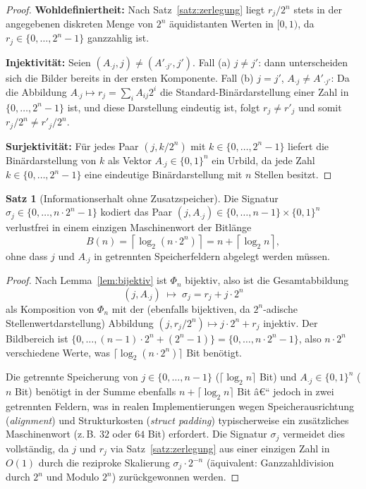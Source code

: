 ﻿\documentclass[a4paper,12pt]{article}
\theoremstyle{definition}
\newtheorem{satz}{Satz}
\begin{document}
\begin{proof}
	\textbf{Wohldefiniertheit:} Nach Satz~\ref{satz:zerlegung} liegt
	$r_j/2^n$ stets in der angegebenen diskreten Menge von $2^n$ äquidistanten
	Werten in $[0,1)$, da $r_j \in \{0,\ldots,2^n-1\}$ ganzzahlig ist.

	\textbf{Injektivität:} Seien $(A_{\cdot j}, j) \neq (A'_{\cdot j'}, j')$.
	Fall (a) $j \neq j'$: dann unterscheiden sich die Bilder bereits in der
	ersten Komponente. Fall (b) $j = j'$, $A_{\cdot j} \neq A'_{\cdot j'}$:
	Da die Abbildung $A_{\cdot j} \mapsto r_j = \sum_i A_{ij}2^i$ die
	Standard-Binärdarstellung einer Zahl in $\{0,\ldots,2^n-1\}$ ist, und
	diese Darstellung eindeutig ist, folgt $r_j \neq r'_j$ und somit
	$r_j/2^n \neq r'_j/2^n$.

	\textbf{Surjektivität:} Für jedes Paar $(j, k/2^n)$ mit
	$k\in\{0,\ldots,2^n-1\}$ liefert die Binärdarstellung von $k$ als Vektor
	$A_{\cdot j} \in \{0,1\}^n$ ein Urbild, da jede Zahl $k \in \{0,\ldots,2^n-1\}$
	eine eindeutige Binärdarstellung mit $n$ Stellen besitzt. \qedhere
\end{proof}

\begin{satz}[Informationserhalt ohne Zusatzspeicher]
\label{satz:infoerhalt}
	Die Signatur $\sigma_j \in \{0,\ldots,n\cdot 2^n - 1\}$ kodiert das Paar
	$(j, A_{\cdot j}) \in \{0,\ldots,n-1\}\times\{0,1\}^n$ verlustfrei in
	einem einzigen Maschinenwort der Bitlänge
	\[
		B(n) = \left\lceil \log_2(n\cdot 2^n) \right\rceil
		= n + \left\lceil \log_2 n \right\rceil,
	\]
	ohne dass $j$ und $A_{\cdot j}$ in getrennten Speicherfeldern abgelegt
	werden müssen.
\end{satz}

\begin{proof}
	Nach Lemma~\ref{lem:bijektiv} ist $\Phi_n$ bijektiv, also ist die
	Gesamtabbildung
	\[
		(j, A_{\cdot j}) \;\longmapsto\; \sigma_j = r_j + j\cdot 2^n
	\]
	als Komposition von $\Phi_n$ mit der (ebenfalls bijektiven, da
	$2^n$-adische Stellenwertdarstellung) Abbildung
	$(j, r_j/2^n) \mapsto j\cdot 2^n + r_j$ injektiv. Der Bildbereich ist
	$\{0,\ldots, (n-1)\cdot 2^n + (2^n-1)\} = \{0,\ldots,n\cdot2^n-1\}$, also
	$n\cdot 2^n$ verschiedene Werte, was $\lceil\log_2(n\cdot2^n)\rceil$ Bit
	benötigt.

	Die getrennte Speicherung von $j\in\{0,\ldots,n-1\}$
	($\lceil\log_2 n\rceil$ Bit) und $A_{\cdot j}\in\{0,1\}^n$ ($n$ Bit)
	benötigt in der Summe ebenfalls $n + \lceil\log_2 n\rceil$ Bit â€“ jedoch
	in zwei getrennten Feldern, was in realen Implementierungen wegen
	Speicherausrichtung (\emph{alignment}) und Strukturkosten
	(\emph{struct padding}) typischerweise ein zusätzliches Maschinenwort
	(z.\,B. $32$ oder $64$ Bit) erfordert. Die Signatur $\sigma_j$ vermeidet
	dies vollständig, da $j$ und $r_j$ via Satz~\ref{satz:zerlegung} aus
	einer einzigen Zahl in $O(1)$ durch die reziproke Skalierung
	$\sigma_j \cdot 2^{-n}$ (äquivalent: Ganzzahldivision durch $2^n$
	und Modulo $2^n$) zurückgewonnen werden. \qedhere
\end{proof}
\end{document}
